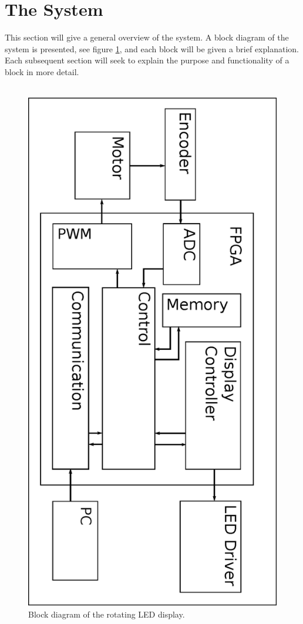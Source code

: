 \section{The System}
This section will give a general overview of the system. 
A block diagram of the system is presented, see figure \ref{fig:block}, and each block will be given a brief explanation.
Each subsequent section will seek to explain the purpose and functionality of a block in more detail.\\~\\

\begin{figure}[H]
	\centering
	\includegraphics[angle=90,width=.8\linewidth]{images/block_diagram}
	\caption{Block diagram of the rotating LED display.}
	\label{fig:block}
\end{figure}

